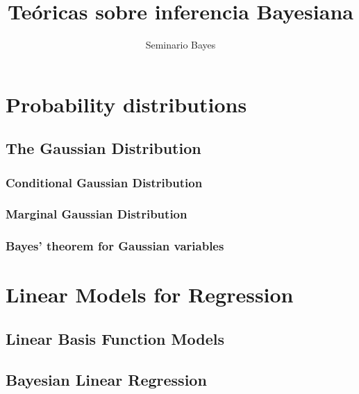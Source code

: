\documentclass[a4paper,10pt]{book}
\title{Te\'oricas sobre inferencia Bayesiana}
\author{Seminario Bayes}
\begin{document}
\maketitle

\chapter{Probability distributions}

    \section{The Gaussian Distribution}

    

        \subsection{Conditional Gaussian Distribution}

        

        \subsection{Marginal Gaussian Distribution}

        
        
        \subsection{Bayes' theorem for Gaussian variables}
        
        

\chapter{Linear Models for Regression}

    \section{Linear Basis Function Models}
    
    
    
    \section{Bayesian Linear Regression}
    
\end{document}
